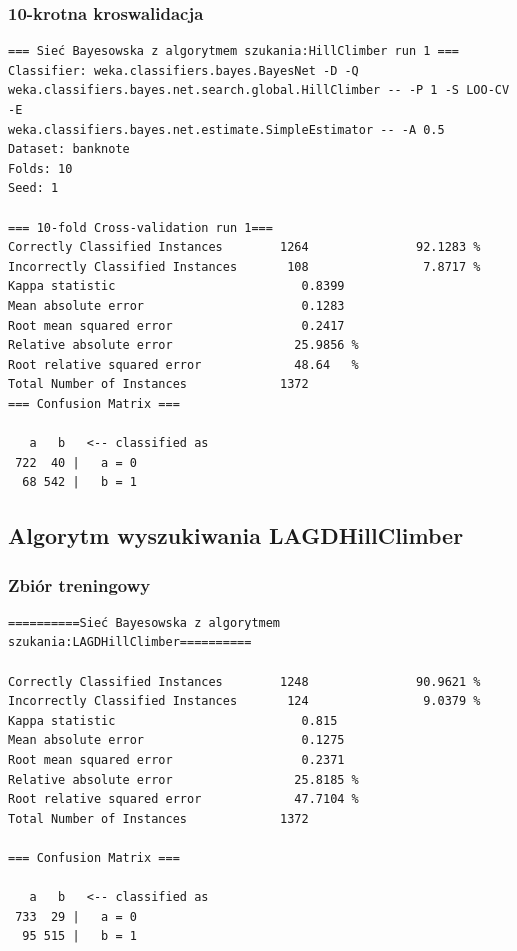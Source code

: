 \documentclass{classrep}
\begin{document}
\subsubsection*{10-krotna kroswalidacja}
\scriptsize 
\begin{verbatim}
=== Sieć Bayesowska z algorytmem szukania:HillClimber run 1 ===
Classifier: weka.classifiers.bayes.BayesNet -D -Q
weka.classifiers.bayes.net.search.global.HillClimber -- -P 1 -S LOO-CV -E
weka.classifiers.bayes.net.estimate.SimpleEstimator -- -A 0.5
Dataset: banknote
Folds: 10
Seed: 1

=== 10-fold Cross-validation run 1===
Correctly Classified Instances        1264               92.1283 %
Incorrectly Classified Instances       108                7.8717 %
Kappa statistic                          0.8399
Mean absolute error                      0.1283
Root mean squared error                  0.2417
Relative absolute error                 25.9856 %
Root relative squared error             48.64   %
Total Number of Instances             1372     
=== Confusion Matrix ===

   a   b   <-- classified as
 722  40 |   a = 0
  68 542 |   b = 1
\end{verbatim} 
\normalsize

\subsection{Algorytm wyszukiwania LAGDHillClimber}
\subsubsection*{Zbiór treningowy}
\scriptsize 
\begin{verbatim}
==========Sieć Bayesowska z algorytmem szukania:LAGDHillClimber==========

Correctly Classified Instances        1248               90.9621 %
Incorrectly Classified Instances       124                9.0379 %
Kappa statistic                          0.815 
Mean absolute error                      0.1275
Root mean squared error                  0.2371
Relative absolute error                 25.8185 %
Root relative squared error             47.7104 %
Total Number of Instances             1372     

=== Confusion Matrix ===

   a   b   <-- classified as
 733  29 |   a = 0
  95 515 |   b = 1
\end{verbatim} 
\normalsize
\end{document}
